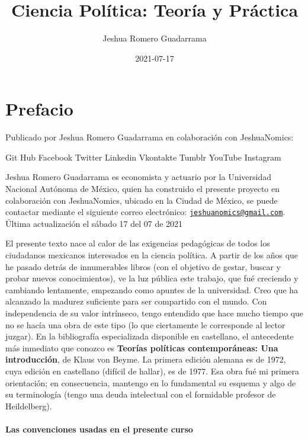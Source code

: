 \documentclass[
]{book}
\title{Ciencia Política: Teoría y Práctica}
\author{Jeshua Romero Guadarrama}
\date{2021-07-17}
\begin{document}
\maketitle

{
\setcounter{tocdepth}{1}
\tableofcontents
}
\hypertarget{prefacio}{%
\chapter*{Prefacio}\label{prefacio}}

Publicado por Jeshua Romero Guadarrama en colaboración con JeshuaNomics:

{ Git Hub}
{ Facebook}
{ Twitter}
{ Linkedin}
{ Vkontakte}
{ Tumblr}
{ YouTube}
{ Instagram}

Jeshua Romero Guadarrama es economista y actuario por la Universidad Nacional Autónoma de México, quien ha construido el presente proyecto en colaboración con JeshuaNomics, ubicado en la Ciudad de México, se puede contactar mediante el siguiente correo electrónico: \href{mailto:jeshuanomics@gmail.com}{\nolinkurl{jeshuanomics@gmail.com}}.
Última actualización el sábado 17 del 07 de 2021

El presente texto nace al calor de las exigencias pedagógicas de todos los ciudadanos mexicanos interesados en la ciencia política. A partir de los años que he pasado detrás de innumerables libros (con el objetivo de gestar, buscar y probar nuevos conocimientos), ve la luz pública este trabajo, que fué creciendo y cambiando lentamente, empezando como apuntes de la universidad. Creo que ha alcanzado la madurez suficiente para ser compartido con el mundo. Con independencia de su valor intrínseco, tengo entendido que hace mucho tiempo que no se hacía una obra de este tipo (lo que ciertamente le corresponde al lector juzgar). En la bibliografía especializada disponible en castellano, el antecedente más inmediato que conozco es \textbf{Teorías políticas contemporáneas: Una introducción}, de Klaus von Beyme. La primera edición alemana es de 1972, cuya edición en castellano (difícil de hallar), es de 1977. Esa obra fué mi primera orientación; en consecuencia, mantengo en lo fundamental su esquema y algo de su terminología (tengo una deuda intelectual con el formidable profesor de Heildelberg).

\hypertarget{las-convenciones-usadas-en-el-presente-curso}{%
\subsubsection*{Las convenciones usadas en el presente curso}\label{las-convenciones-usadas-en-el-presente-curso}}
\end{document}
